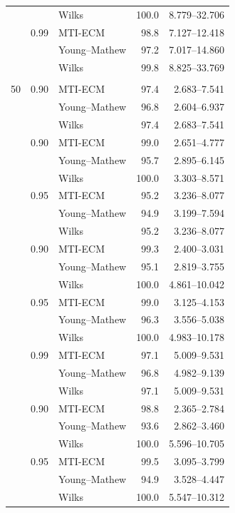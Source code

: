 \begin{longtable}{@{}rrlrr@{}}
 &  & Wilks & 100.0 & 8.779--32.706 \\
\addlinespace[0.25em]
1000 & 0.99 & MTI-ECM & 98.8 & 7.127--12.418 \\
 &  & Young--Mathew & 97.2 & 7.017--14.860 \\
 &  & Wilks & 99.8 & 8.825--33.769 \\
\addlinespace[0.25em]
\multicolumn{5}{@{}l}{\textit{Exponential}}\\
50 & 0.90 & MTI-ECM & 97.4 & 2.683--7.541 \\
 &  & Young--Mathew & 96.8 & 2.604--6.937 \\
 &  & Wilks & 97.4 & 2.683--7.541 \\
\addlinespace[0.25em]
100 & 0.90 & MTI-ECM & 99.0 & 2.651--4.777 \\
 &  & Young--Mathew & 95.7 & 2.895--6.145 \\
 &  & Wilks & 100.0 & 3.303--8.571 \\
\addlinespace[0.25em]
100 & 0.95 & MTI-ECM & 95.2 & 3.236--8.077 \\
 &  & Young--Mathew & 94.9 & 3.199--7.594 \\
 &  & Wilks & 95.2 & 3.236--8.077 \\
\addlinespace[0.25em]
500 & 0.90 & MTI-ECM & 99.3 & 2.400--3.031 \\
 &  & Young--Mathew & 95.1 & 2.819--3.755 \\
 &  & Wilks & 100.0 & 4.861--10.042 \\
\addlinespace[0.25em]
500 & 0.95 & MTI-ECM & 99.0 & 3.125--4.153 \\
 &  & Young--Mathew & 96.3 & 3.556--5.038 \\
 &  & Wilks & 100.0 & 4.983--10.178 \\
\addlinespace[0.25em]
500 & 0.99 & MTI-ECM & 97.1 & 5.009--9.531 \\
 &  & Young--Mathew & 96.8 & 4.982--9.139 \\
 &  & Wilks & 97.1 & 5.009--9.531 \\
\addlinespace[0.25em]
1000 & 0.90 & MTI-ECM & 98.8 & 2.365--2.784 \\
 &  & Young--Mathew & 93.6 & 2.862--3.460 \\
 &  & Wilks & 100.0 & 5.596--10.705 \\
\addlinespace[0.25em]
1000 & 0.95 & MTI-ECM & 99.5 & 3.095--3.799 \\
 &  & Young--Mathew & 94.9 & 3.528--4.447 \\
 &  & Wilks & 100.0 & 5.547--10.312 \\

\end{longtable}
